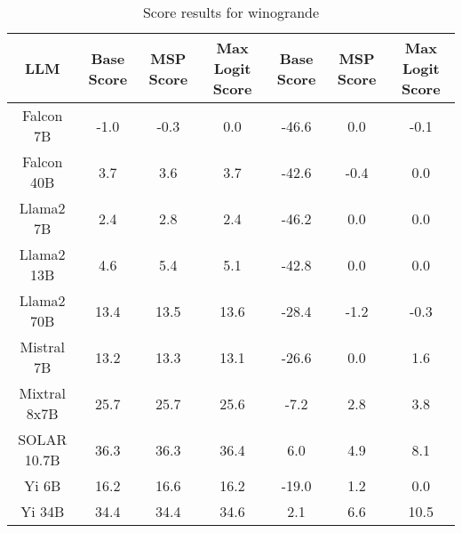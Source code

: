 \renewcommand\arraystretch{1.2}
\begin{table*}
\centering
\begin{tabular}{c|c|c|c|c|c|c}
LLM & Base Score & MSP Score & Max Logit Score & Base Score & MSP Score & Max Logit Score\\ \hline
Falcon 7B & -1.0 & -0.3 & 0.0 & -46.6 & 0.0 & -0.1\\
Falcon 40B & 3.7 & 3.6 & 3.7 & -42.6 & -0.4 & 0.0\\
Llama2 7B & 2.4 & 2.8 & 2.4 & -46.2 & 0.0 & 0.0\\
Llama2 13B & 4.6 & 5.4 & 5.1 & -42.8 & 0.0 & 0.0\\
Llama2 70B & 13.4 & 13.5 & 13.6 & -28.4 & -1.2 & -0.3\\
Mistral 7B & 13.2 & 13.3 & 13.1 & -26.6 & 0.0 & 1.6\\
Mixtral 8x7B & 25.7 & 25.7 & 25.6 & -7.2 & 2.8 & 3.8\\
SOLAR 10.7B & 36.3 & 36.3 & 36.4 & 6.0 & 4.9 & 8.1\\
Yi 6B & 16.2 & 16.6 & 16.2 & -19.0 & 1.2 & 0.0\\
Yi 34B & 34.4 & 34.4 & 34.6 & 2.1 & 6.6 & 10.5\\
\hline
\end{tabular}
\caption{Score results for winogrande}
\end{table*}
\label{tab:winogrande_score}
